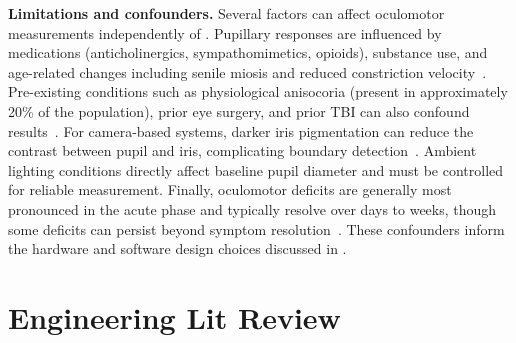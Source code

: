 \textbf{Limitations and confounders.} Several factors can affect oculomotor measurements independently of . Pupillary responses are influenced by medications (anticholinergics, sympathomimetics, opioids), substance use, and age-related changes including senile miosis and reduced constriction velocity~\cite{mcdougal2015autonomic, huang2024age}. Pre-existing conditions such as physiological anisocoria (present in approximately 20\% of the population), prior eye surgery, and prior TBI can also confound results~\cite{lam1987anisocoria}. For camera-based systems, darker iris pigmentation can reduce the contrast between pupil and iris, complicating boundary detection~\cite{barry2023racially}. Ambient lighting conditions directly affect baseline pupil diameter and must be controlled for reliable measurement. Finally, oculomotor deficits are generally most pronounced in the acute phase and typically resolve over days to weeks, though some deficits can persist beyond symptom resolution~\cite{sussman2016oculomotor}. These confounders inform the hardware and software design choices discussed in .


\section{Engineering Lit Review}
\label{sec:bg-engineering}

